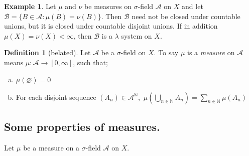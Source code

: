 \documentclass{article}
\newcommand{\N}{\mathbb{N}}
\theoremstyle{definition}
\newtheorem*{example}{Example}
\newtheorem*{definition}{Definition}
\begin{document}
\begin{example}
    Let $\mu$ and $\nu$ be measures on $\sigma$-field $\mathscr{A}$ on $X$ and let $\mathscr{B} = \{B \in \mathscr{A} : \mu(B) = \nu(B) \}$. Then $\mathscr{B}$ need not be closed under countable unions, but it is closed under countable disjoint unions.
    If in addition $\mu(X) = \nu(X) < \infty$, then $\mathscr{B}$ is a $\lambda$ system on $X$.
\end{example}

\begin{definition}[belated]
    Let $\mathscr{A}$ be a $\sigma$-field on $X$. To say $\mu$ is a \emph{measure} on $\mathscr{A}$ means $\mu: \mathscr{A} \to [0,\infty]$, such that;
    \begin{enumerate}[(a)]
        \item $\mu(\varnothing) = 0$
        \item For each disjoint sequence $(A_n) \in \mathscr{A}^{\N}$,\ $\mu\left( \bigcup_{n \in \N} A_n \right) = \sum_{n \in \N} \mu(A_n)$
    \end{enumerate}
\end{definition}

\subsection*{Some properties of measures.}

Let $\mu$ be a measure on a $\sigma$-field $\mathscr{A}$ on $X$.
\end{document}
